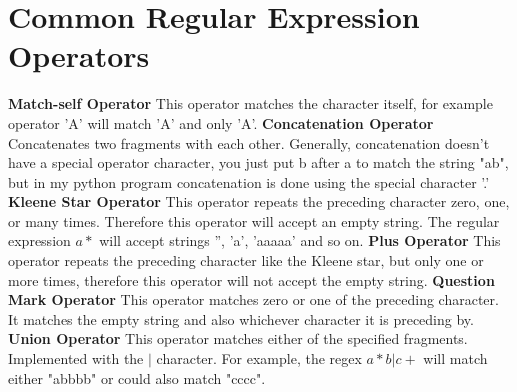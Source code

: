 \documentclass[12pt]{article}
\begin{document}
\section{Common Regular Expression Operators}
\textbf{Match-self Operator}\newline
This operator matches the character itself, for example operator 'A' will match 'A' and only 'A'.
\newline\newline
\textbf{Concatenation Operator}\newline
Concatenates two fragments with each other. Generally, concatenation doesn't have a special operator character, you just put b after a to match the string "ab", but in my python program concatenation is done using the special character '.'
\newline\newline
\textbf{Kleene Star Operator}\newline
This operator repeats the preceding character zero, one, or many times. Therefore this operator will accept an empty string. The regular expression $a*$ will accept strings '', 'a', 'aaaaa' and so on.
\newline\newline
\textbf{Plus Operator}\newline
This operator repeats the preceding character like the Kleene star, but only one or more times, therefore this operator will not accept the empty string.
\newline\newline
\textbf{Question Mark Operator}\newline
This operator matches zero or one of the preceding character. It matches the empty string and also whichever character it is preceding by.
\newline\newline
\textbf{Union Operator}\newline
This operator matches either of the specified fragments. Implemented with the $|$ character. For example, the regex $a*b|c+$ will match either "abbbb" or could also match "cccc".
\cite{MIT}
\newpage
\end{document}
